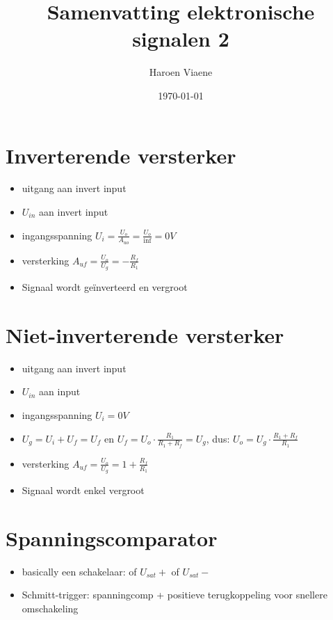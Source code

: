 \documentclass[11pt]{article}
\title{Samenvatting elektronische signalen 2}
\author{Haroen Viaene}
\date{\today}
\let\originalitem\item
\renewcommand{\item}{\originalitem[]}
\newcommand{\Newpage}{\end{preview}\begin{preview}}
\begin{document}
\begin{preview}

\maketitle

\tableofcontents

\Newpage

\section{Inverterende versterker}

\begin{itemize}
  \item uitgang aan invert input
  \item $ U_{in} $ aan invert input
  \item ingangsspanning $ U_i = \frac{U_o}{A_{uo}} = \frac{U_o}{\inf} = 0V $
  \item versterking $ A_{uf} = \frac{U_o}{U_g} = -\frac{R_f}{R_1} $
  \item Signaal wordt geïnverteerd en vergroot
\end{itemize}

\section{Niet-inverterende versterker}

\begin{itemize}
  \item uitgang aan invert input
  \item $ U_{in} $ aan input
  \item ingangsspanning $ U_i = 0V $
  \item $ U_g = U_i + U_f = U_f $ en $ U_f = U_o \cdot \frac{R_1}{R_1+R_f} = U_g $, dus: $ U_o = U_g \cdot\frac{R_1+R_f}{R_1} $
  \item versterking $ A_{uf} = \frac{U_o}{U_g} = 1 + \frac{R_f}{R_1} $
  \item Signaal wordt enkel vergroot
\end{itemize}

\section{Spanningscomparator}

\begin{itemize}
  \item basically een schakelaar: of $ U_{sat}+ $ of $ U_{sat}- $
  \item Schmitt-trigger: spanningcomp + positieve terugkoppeling voor snellere omschakeling
\end{itemize}


\end{preview}
\end{document}
